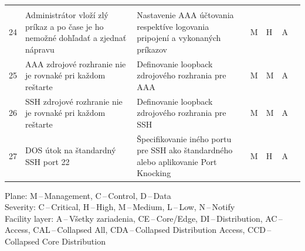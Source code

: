 \begin{longtable}[!htbp]{|C{2.5em}L{11em}L{11em}C{2.5em}C{4em}C{5em}L{2.5em}|}
	\cite{Singh2018}	\\
	24	&Administrátor vloží zlý príkaz a po čase je ho nemožné dohľadať a zjednať nápravu	&Nastavenie AAA účtovania respektíve logovania pripojení a vykonaných príkazov	&M	&H	&A	& \cite{CIS_DrTLsgXv24lxeIIM}	\\
	 25	&AAA zdrojové rozhranie nie je rovnaké pri každom reštarte	&Definovanie loopback zdrojového rozhrania pre AAA	&M	&M	&A	& \cite{CIS_DrTLsgXv24lxeIIM}	\\
	26	&SSH zdrojové rozhranie nie je rovnaké pri každom reštarte	& Definovanie loopback zdrojového rozhrania pre SSH	&M	&M	&A	& \cite{CIS_DrTLsgXv24lxeIIM}	\\
	 27	&DOS útok na štandardný SSH port 22	&Špecifikovanie iného portu pre SSH ako štandardného alebo aplikovanie Port Knocking \cite{MJVmQiKUgZl92S8u}	&M	&H	&A	& \cite{MJVmQiKUgZl92S8u}	\\
	\hline
	
	
\end{longtable}%
\vspace{-1em}
{\tiny 
	\noindent
	Plane: M\,--\,Management, C\,--\,Control, D\,--\,Data\\
	Severity: C\,--\,Critical, H\,--\,High, M\,--\,Medium, L\,--\,Low, N\,--\,Notify\\
	Facility layer: A\,--\,Všetky zariadenia, CE\,--\,Core/Edge, DI\,--\,Distribution, AC\,--\,Access, CAL\,--\,Collapsed All, CDA\,--\,Collapsed Distribution Access, CCD\,--\,Collapsed Core Distribution}


